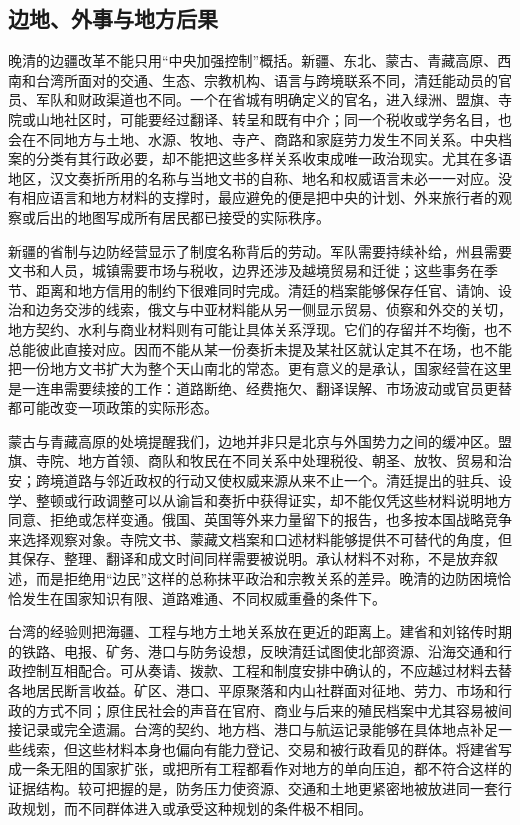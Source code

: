 \subsection{边地、外事与地方后果}

晚清的边疆改革不能只用“中央加强控制”概括。新疆、东北、蒙古、青藏高原、西南和台湾所面对的交通、生态、宗教机构、语言与跨境联系不同，清廷能动员的官员、军队和财政渠道也不同。一个在省城有明确定义的官名，进入绿洲、盟旗、寺院或山地社区时，可能要经过翻译、转呈和既有中介；同一个税收或学务名目，也会在不同地方与土地、水源、牧地、寺产、商路和家庭劳力发生不同关系。中央档案的分类有其行政必要，却不能把这些多样关系收束成唯一政治现实。尤其在多语地区，汉文奏折所用的名称与当地文书的自称、地名和权威语言未必一一对应。没有相应语言和地方材料的支撑时，最应避免的便是把中央的计划、外来旅行者的观察或后出的地图写成所有居民都已接受的实际秩序。

新疆的省制与边防经营显示了制度名称背后的劳动。军队需要持续补给，州县需要文书和人员，城镇需要市场与税收，边界还涉及越境贸易和迁徙；这些事务在季节、距离和地方信用的制约下很难同时完成。清廷的档案能够保存任官、请饷、设治和边务交涉的线索，俄文与中亚材料能从另一侧显示贸易、侦察和外交的关切，地方契约、水利与商业材料则有可能让具体关系浮现。它们的存留并不均衡，也不总能彼此直接对应。因而不能从某一份奏折未提及某社区就认定其不在场，也不能把一份地方文书扩大为整个天山南北的常态。更有意义的是承认，国家经营在这里是一连串需要续接的工作：道路断绝、经费拖欠、翻译误解、市场波动或官员更替都可能改变一项政策的实际形态。

蒙古与青藏高原的处境提醒我们，边地并非只是北京与外国势力之间的缓冲区。盟旗、寺院、地方首领、商队和牧民在不同关系中处理税役、朝圣、放牧、贸易和治安；跨境道路与邻近政权的行动又使权威来源从来不止一个。清廷提出的驻兵、设学、整顿或行政调整可以从谕旨和奏折中获得证实，却不能仅凭这些材料说明地方同意、拒绝或怎样变通。俄国、英国等外来力量留下的报告，也多按本国战略竞争来选择观察对象。寺院文书、蒙藏文档案和口述材料能够提供不可替代的角度，但其保存、整理、翻译和成文时间同样需要被说明。承认材料不对称，不是放弃叙述，而是拒绝用“边民”这样的总称抹平政治和宗教关系的差异。晚清的边防困境恰恰发生在国家知识有限、道路难通、不同权威重叠的条件下。

台湾的经验则把海疆、工程与地方土地关系放在更近的距离上。建省和刘铭传时期的铁路、电报、矿务、港口与防务设想，反映清廷试图使北部资源、沿海交通和行政控制互相配合。可从奏请、拨款、工程和制度安排中确认的，不应越过材料去替各地居民断言收益。矿区、港口、平原聚落和内山社群面对征地、劳力、市场和行政的方式不同；原住民社会的声音在官府、商业与后来的殖民档案中尤其容易被间接记录或完全遗漏。台湾的契约、地方档、港口与航运记录能够在具体地点补足一些线索，但这些材料本身也偏向有能力登记、交易和被行政看见的群体。将建省写成一条无阻的国家扩张，或把所有工程都看作对地方的单向压迫，都不符合这样的证据结构。较可把握的是，防务压力使资源、交通和土地更紧密地被放进同一套行政规划，而不同群体进入或承受这种规划的条件极不相同。

